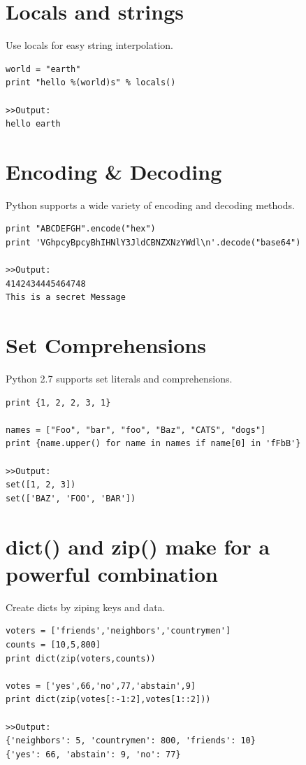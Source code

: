 \documentclass[12pt,a4paper,final,twoside,onecolumn,titlepage]{book}
\begin{document}
\section{Locals and strings}
Use locals for easy string interpolation.

\begin{lstlisting}
world = "earth"
print "hello %(world)s" % locals()

>>Output:
hello earth

\end{lstlisting}


\section{Encoding \& Decoding}
Python supports a wide variety of encoding and decoding methods.
\begin{lstlisting}
print "ABCDEFGH".encode("hex")
print 'VGhpcyBpcyBhIHNlY3JldCBNZXNzYWdl\n'.decode("base64")

>>Output:
4142434445464748
This is a secret Message
\end{lstlisting}

\section{Set Comprehensions}
Python 2.7 supports set literals and comprehensions.

\begin{lstlisting}
print {1, 2, 2, 3, 1}

names = ["Foo", "bar", "foo", "Baz", "CATS", "dogs"]
print {name.upper() for name in names if name[0] in 'fFbB'}

>>Output:
set([1, 2, 3])
set(['BAZ', 'FOO', 'BAR'])
\end{lstlisting}


\section{dict() and zip() make for a powerful combination}
Create dicts by ziping keys and data.
\begin{lstlisting}
voters = ['friends','neighbors','countrymen']
counts = [10,5,800]
print dict(zip(voters,counts))

votes = ['yes',66,'no',77,'abstain',9]
print dict(zip(votes[:-1:2],votes[1::2]))

>>Output:
{'neighbors': 5, 'countrymen': 800, 'friends': 10}
{'yes': 66, 'abstain': 9, 'no': 77}
\end{lstlisting}
\end{document}
